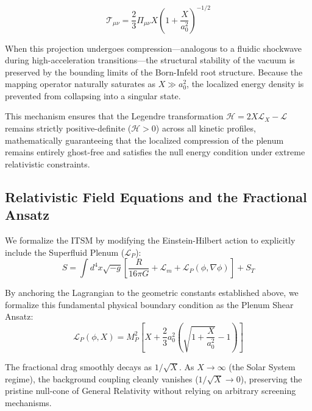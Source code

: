 \documentclass[aps,prd,10pt,twocolumn,superscriptaddress,nofootinbib,floatfix]{revtex4-2}
\begin{document}
\begin{equation}
\mathcal{T}_{\mu\nu} = \frac{2}{3} \Pi_{\mu\nu} X \left( 1 + \frac{X}{a_0^2} \right)^{-1/2}
\end{equation}

When this projection undergoes compression—analogous to a fluidic shockwave during high-acceleration transitions—the structural stability of the vacuum is preserved by the bounding limits of the Born-Infeld root structure. Because the mapping operator naturally saturates as $X \gg a_0^2$, the localized energy density is prevented from collapsing into a singular state. 

This mechanism ensures that the Legendre transformation $\mathcal{H} = 2X\mathcal{L}_X - \mathcal{L}$ remains strictly positive-definite ($\mathcal{H} > 0$) across all kinetic profiles, mathematically guaranteeing that the localized compression of the plenum remains entirely ghost-free and satisfies the null energy condition under extreme relativistic constraints.

\subsection{Relativistic Field Equations and the Fractional Ansatz}
We formalize the ITSM by modifying the Einstein-Hilbert action to explicitly include the Superfluid Plenum ($\mathcal{L}_P$):
\begin{equation}
S = \int d^4x \sqrt{-g} \left[ \frac{R}{16\pi G} + \mathcal{L}_m + \mathcal{L}_P(\phi, \nabla\phi) \right] + S_T
\end{equation}

By anchoring the Lagrangian to the geometric constants established above, we formalize this fundamental physical boundary condition as the Plenum Shear Ansatz:
\begin{equation} \label{eq:plenum_shear_ansatz}
\mathcal{L}_P(\phi, X) = M_P^2 \left[ X + \frac{2}{3}a_0^2 \left(\sqrt{1+\frac{X}{a_0^2}} - 1 \right) \right]
\end{equation}

The fractional drag smoothly decays as $1/\sqrt{X}$. As $X \rightarrow \infty$ (the Solar System regime), the background coupling cleanly vanishes ($1/\sqrt{X} \rightarrow 0$), preserving the pristine null-cone of General Relativity without relying on arbitrary screening mechanisms.
\end{document}
